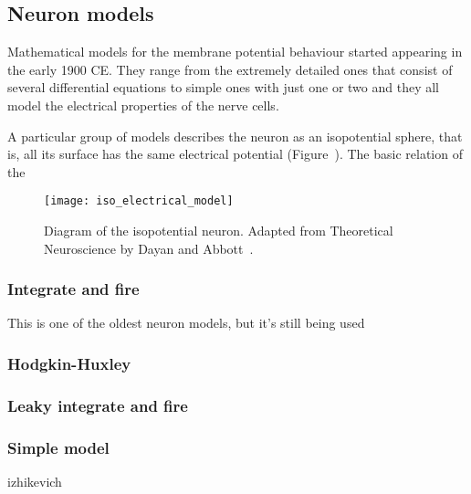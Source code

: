 \subsection{Neuron models}

Mathematical models for the membrane potential behaviour started appearing in the early 1900 CE. They range from the extremely detailed ones that consist of several differential equations to simple ones with just one or two and they all model the electrical properties of the nerve cells. 

A particular group of models describes the neuron as an isopotential sphere, that is, all its surface has the same electrical potential (Figure~). The basic relation of the 

\begin{figure}[hbt]
  \begin{center}
    \texttt{[image: iso\_electrical\_model]}
    \caption{Diagram of the isopotential neuron. Adapted from Theoretical Neuroscience by Dayan and Abbott~\cite{dayan2001theoretical}.}
  \end{center}
\end{figure}


\subsubsection{Integrate and fire}
This is one of the oldest neuron models, but it's still being used
\subsubsection{Hodgkin-Huxley}

\subsubsection{Leaky integrate and fire}

\subsubsection{Simple model}
izhikevich